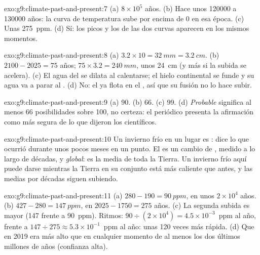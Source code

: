 \begin{solution}{exo:g9:climate-past-and-present:7}
(a) $8 \times 10^5$ años. (b) Hace unos \num{120000} a \num{130000} años:
la curva de temperatura sube por encima de 0 en esa época. (c) Unas
\qty{275}{ppm}. (d) Sí: los picos y los  de las dos curvas aparecen
en los mismos momentos.
\end{solution}

\begin{solution}{exo:g9:climate-past-and-present:8}
(a) $3.2 \times 10 = \qty{32}{mm} = \qty{3.2}{cm}$. (b) $2100 - 2025 =
75$ años; $75 \times 3.2 = \qty{240}{mm}$, unos \qty{24}{cm} (y más si la
subida se acelera). (c) El agua del  se dilata al calentarse; el hielo
continental se funde y su agua va a parar al . (d) No: el 
ya flota en el , así que su fusión no lo hace subir.
\end{solution}

\begin{solution}{exo:g9:climate-past-and-present:9}
(a) 90. (b) 66. (c) 99. (d) \emph{Probable} significa al menos 66
posibilidades sobre 100, no certeza: el periódico presenta la afirmación
como más segura de lo que dijeron los científicos.
\end{solution}

\begin{solution}{exo:g9:climate-past-and-present:10}
Un invierno frío en un lugar es \emph{}: dice lo que ocurrió durante
unos pocos meses en un punto. El  es un cambio de
\emph{}, medido a lo largo de décadas, y \emph{global}: es la media
de toda la Tierra. Un invierno frío aquí puede darse mientras la Tierra en
su conjunto está más caliente que antes, y las medias por décadas siguen
subiendo.
\end{solution}

\begin{solution}{exo:g9:climate-past-and-present:11}
(a) $280 - 190 = \qty{90}{ppm}$, en unos $2 \times 10^4$ años. (b) $427
- 280 = \qty{147}{ppm}$, en $2025 - 1750 = 275$ años. (c) La segunda
subida es mayor (147 frente a 90~ppm). Ritmos: $90 \div (2 \times 10^4) =
4.5 \times 10^{-3}$~ppm al año, frente a $147 \div 275 \approx 5.3 \times
10^{-1}$~ppm al año: unas 120 veces más rápida. (d) Que en 2019 era más
alto que en cualquier momento de al menos los dos últimos millones de años
(confianza alta).
\end{solution}


